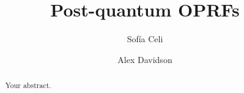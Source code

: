 \documentclass{article}
\begin{document}
\title{Post-quantum OPRFs}
\author[1]{Sofía Celi}
\author[1]{Alex Davidson}


\maketitle

\begin{abstract}
Your abstract.
\end{abstract}





\end{document}

